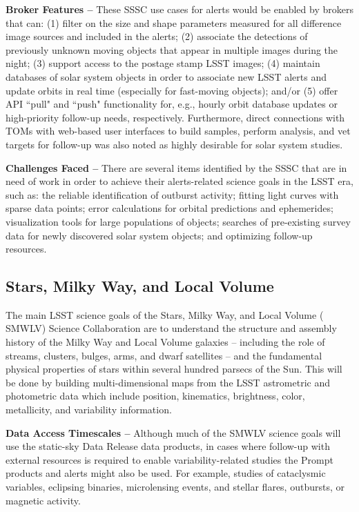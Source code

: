 {\bf  {Broker} Features --}
These  {SSSC} use cases for alerts would be enabled by brokers that can:
(1) filter on the size and  {shape} parameters measured for all difference image sources and included in the alerts;
(2) associate the detections of previously unknown moving objects that appear in multiple images during the night;
(3) support access to the  {postage stamp}  {LSST} images;
(4) maintain databases of solar system objects in order to associate new  {LSST} alerts and update orbits in real time (especially for fast-moving objects);
and/or (5) offer  {API} ``pull" and ``push" functionality for, e.g., hourly orbit database updates or high-priority follow-up needs, respectively.
Furthermore, direct connections with TOMs with web-based user interfaces to build samples, perform analysis, and vet targets for follow-up was also noted as highly desirable for solar system studies. 

{\bf Challenges Faced --}
There are several items identified by the  {SSSC} that are in need of work in order to achieve their alerts-related science goals in the  {LSST} era, such as: 
the reliable identification of outburst activity; 
fitting light curves with sparse data points; 
error calculations for orbital predictions and ephemerides; 
visualization tools for large populations of objects; 
searches of pre-existing survey data for newly discovered solar system objects; and
optimizing follow-up resources.

\subsection{Stars, Milky Way, and Local Volume}\label{ssec:sci_smwlv}

The main  {LSST} science goals of the Stars, Milky Way, and Local Volume ( {SMWLV})  {Science Collaboration} are to understand the structure and assembly history of the Milky Way and Local Volume galaxies -- including the role of streams, clusters, bulges, arms, and dwarf satellites -- and the fundamental physical properties of stars within several hundred parsecs of the Sun.
This will be done by building multi-dimensional maps from the  {LSST} astrometric and photometric data which include position, kinematics, brightness, color, metallicity, and variability information. 

{\bf Data Access Timescales --}
Although much of the  {SMWLV} science goals will use the static-sky  {Data Release} data products, in cases where follow-up with external resources is required to enable variability-related studies the Prompt products and alerts might also be used.
For example, studies of cataclysmic variables, eclipsing binaries, microlensing events, and stellar flares, outbursts, or magnetic activity.


